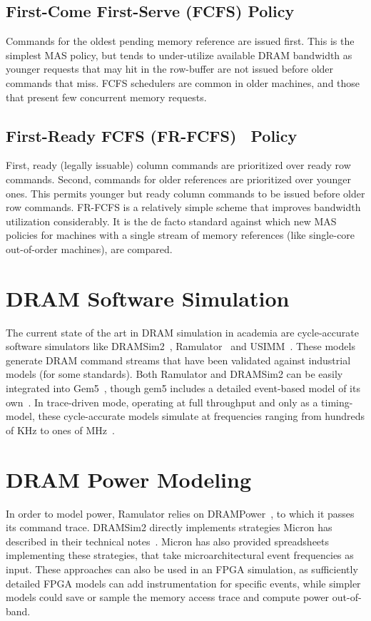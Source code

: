 \subsection{First-Come First-Serve (FCFS) Policy}\label{fcfs} Commands for the
oldest pending memory reference are issued first. This is the simplest MAS
policy, but tends to under-utilize available DRAM bandwidth as younger requests
that may hit in the row-buffer are not issued before older commands that miss.
FCFS schedulers are common in older machines, and those that present few
concurrent memory requests.

\subsection{First-Ready FCFS (FR-FCFS)~\cite{frfcfs} Policy}\label{frfcfs}
First, ready (legally issuable) column commands are prioritized over ready row
commands. Second, commands for older references are prioritized over younger
ones. This permits younger but ready column commands to be issued before older
row commands. FR-FCFS is a relatively simple scheme that improves bandwidth
utilization considerably. It is the de facto standard against which new MAS
policies for machines with a single stream of memory references (like
single-core out-of-order machines), are compared.

\section{DRAM Software Simulation}

The current state of the art in DRAM simulation in academia are cycle-accurate
software simulators like DRAMSim2~\cite{dramsim}, Ramulator~\cite{ramulator} and
USIMM~\cite{usimm}. These models generate DRAM command streams that have been
validated against industrial models (for some standards). Both Ramulator and
DRAMSim2 can be easily integrated into Gem5~\cite{gem5}, though gem5 includes a
detailed event-based model of its own~\cite{gem5event}. In trace-driven mode,
operating at full throughput and only as a timing-model, these cycle-accurate
models simulate at frequencies ranging from hundreds of KHz to ones of
MHz~\cite{ramulator}.

\section{DRAM Power Modeling}

In order to model power, Ramulator relies on DRAMPower~\cite{drampower}, to
which it passes its command trace. DRAMSim2 directly implements strategies
Micron has described in their technical notes~\cite{micronpower}. Micron has
also provided spreadsheets implementing these strategies, that take
microarchitectural event frequencies as input. These approaches can also be
used in an FPGA simulation, as sufficiently detailed FPGA models can add
instrumentation for specific events, while simpler models could save or sample
the memory access trace and compute power out-of-band.

